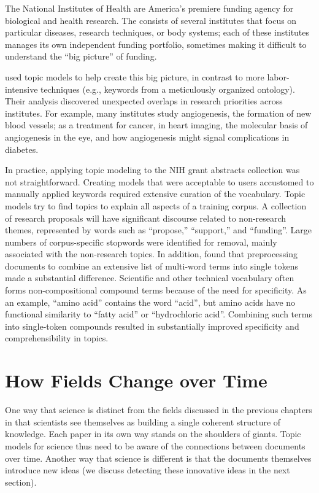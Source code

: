 The National Institutes of Health are America's premiere funding
agency for biological and health research.  The  consists of
several institutes that focus on particular diseases, research techniques, or body
systems; each of these institutes manages its own independent funding portfolio,
sometimes making it difficult to understand the ``big picture'' of funding.

\citet{talley-11} used topic models to help create this big picture,
in contrast to more labor-intensive techniques (e.g., keywords from a
meticulously organized ontology).  Their analysis discovered
unexpected overlaps in research priorities across institutes.  For
example, many institutes study angiogenesis, the formation of new
blood vessels; as a treatment for cancer, in heart imaging, the
molecular basis of angiogenesis in the eye, and how angiogenesis might
signal complications in diabetes.

In practice, applying topic modeling to the NIH grant abstracts collection was not straightforward.
Creating models that were acceptable to users accustomed to manually applied keywords required extensive curation of the vocabulary.
Topic models try to find topics to explain all aspects of a training corpus.
A collection of research proposals will have significant discourse related to non-research themes, represented by words such as ``propose,'' ``support,'' and ``funding''.
Large numbers of corpus-specific stopwords were identified for removal, mainly associated with the non-research topics.
In addition, \citet{talley-11} found that preprocessing documents to combine an extensive list of multi-word terms into single tokens made a substantial difference.
Scientific and other technical vocabulary often forms non-compositional compound terms because of the need for specificity.
As an example, ``amino acid'' contains the word ``acid'', but amino acids have no functional similarity to ``fatty acid'' or ``hydrochloric acid''.
Combining such terms into single-token compounds resulted in substantially improved specificity and comprehensibility in topics.

\section{How Fields Change over Time}
\label{sec:sci_change}

One way that science is distinct from the fields discussed in the
previous chapters in that scientists see themselves as building a single coherent structure of knowledge.  Each
paper in its own way stands on the shoulders of giants. Topic models
for science thus need to be aware of the connections between documents
over time.  Another way that science is different is that the
documents themselves introduce new ideas (we discuss detecting these
innovative ideas in the next section).


